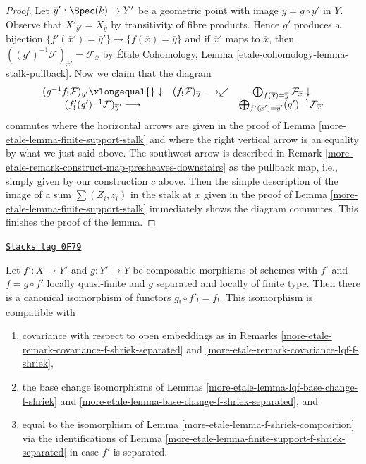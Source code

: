 \begin{proof}
\medskip\noindent
Let $\overline{y}' : \Spec(k) \to Y'$ be a geometric point with image
$\overline{y} = g \circ \overline{y}'$ in $Y$. Observe that
$X'_{\overline{y}'} = X_{\overline{y}}$ by transitivity of
fibre products. Hence $g'$ produces a bijection
$\{f'(\overline{x}') = \overline{y}'\} \to \{f(\overline{x}) = \overline{y}\}$
and if $\overline{x}'$ maps to $\overline{x}$, then
$((g')^{-1}\mathcal{F})_{\overline{x}'} = \mathcal{F}_{\overline{x}}$
by \'Etale Cohomology, Lemma \ref{etale-cohomology-lemma-stalk-pullback}.
Now we claim that the diagram
$$
\begin{array}{ccc}(g^{-1}f_!\mathcal{F})_{\overline{y}'} \xlongequal{}\downarrow & (f_!\mathcal{F})_{\overline{y}} \longrightarrow\swarrow & \bigoplus\nolimits_{f(\overline{x}) = \overline{y}}
\mathcal{F}_{\overline{x}} \downarrow \\ (f'_!(g')^{-1}\mathcal{F})_{\overline{y}'} \longrightarrow &  & \bigoplus\nolimits_{f'(\overline{x}') = \overline{y}'}
(g')^{-1}\mathcal{F}_{\overline{x}'}\end{array}
$$
commutes where the horizontal arrows are given in the proof of
Lemma \ref{more-etale-lemma-finite-support-stalk} and where the right vertical
arrow is an equality by what we just said above. The southwest arrow is
described in Remark \ref{more-etale-remark-construct-map-presheaves-downstairs}
as the pullback map, i.e.,
simply given by our construction $c$ above. Then the simple
description of the image of a sum $\sum (Z_i, z_i)$ in the
stalk at $\overline{x}$ given in the proof of
Lemma \ref{more-etale-lemma-finite-support-stalk} immediately shows the
diagram commutes. This finishes the proof of the lemma.
\end{proof}

\begin{lemma}
\label{more-etale-lemma-lqf-separated-shriek-composition}
\href{https://stacks.math.columbia.edu/tag/0F79}{\texttt{Stacks tag 0F79}}

Let $f' : X \to Y'$ and $g : Y' \to Y$ be composable morphisms of schemes
with $f'$ and $f = g \circ f'$ locally quasi-finite and $g$ separated and
locally of finite type. Then there is a canonical isomorphism of functors
$g_! \circ f'_! = f_!$. This isomorphism is compatible with
\begin{enumerate}
\item[(a)] covariance with respect to open embeddings as in
Remarks \ref{more-etale-remark-covariance-f-shriek-separated} and
\ref{more-etale-remark-covariance-lqf-f-shriek},
\item[(b)] the base change isomorphisms of
Lemmas \ref{more-etale-lemma-lqf-base-change-f-shriek}
and \ref{more-etale-lemma-base-change-f-shriek-separated}, and
\item[(c)] equal to the isomorphism of Lemma \ref{more-etale-lemma-f-shriek-composition}
via the identifications of Lemma \ref{more-etale-lemma-finite-support-f-shriek-separated}
in case $f'$ is separated.
\end{enumerate}
\end{lemma}

